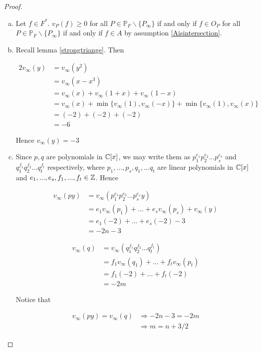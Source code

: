 \begin{proof}
\begin{enumerate}[(a)]
	\item \label{inAiff} Let $f\in F^*$. $v_P(f) \geq 0 $ 
	for all $P\in \mathbb{P}_F \backslash \lbrace P_\infty \rbrace $ 
	if and only if
	$f \in O_P$ for all
	$P\in \mathbb{P}_F \backslash \lbrace P_\infty \rbrace $ 
	if and only if $f \in A$ by assumption \ref{Aisintersection}.

	\item Recall lemma \ref{strongtriange}. Then 

	\begin{align*}
		2v_\infty(y) &= v_\infty(y^2) \\
		&= v_\infty(x - x^3) \\
		&= v_\infty(x) + v_\infty(1+x) + v_\infty (1-x) \\
		&= v_\infty(x) + \min \lbrace v_\infty(1), v_\infty(-x) \rbrace + \min \lbrace v_\infty(1) , v_\infty(x) \rbrace \\
		&= (-2) + (-2) + (-2) \\
		&= -6
	\end{align*}

	Hence $v_\infty(y) = -3 $

	\item Since $p,q$ are polynomials in $\mathbb{C} [x]$, we may 
	write them as $p_1^{e_1}p_2^{e_2}...p_s^{e_s}$ and
	$q_1^{f_1}q_2^{f_2}...q_t^{f_t}$ respectively, 
	where $p_1,...,p_s,q_1,...q_t$ are linear polynomials 
	in $\mathbb{C}[x]$ and $e_1,...,e_s,f_1,...,f_t \in \mathbb{Z}$. Hence 

	\begin{align*}
		v_\infty(py) &=v_\infty(p_1^{e_1}p_2^{e_2}...p_s^{e_s}y) \\
		&= e_1v_\infty(p_1) + ... + e_sv_\infty(p_s) + v_\infty (y)  \\
		&= e_1(-2) + ... + e_s(-2) - 3 \\
		&= -2n - 3
	\end{align*}

	\begin{align*}
		v_\infty(q) &=v_\infty(q_1^{f_1}q_2^{f_2}...q_t^{f_t}) \\
		&= f_1v_\infty(q_1) + ... + f_tv_\infty(p_t)  \\
		&= f_1(-2) + ... + f_t(-2) \\
		&= -2m
	\end{align*}

	Notice that 

	\begin{align*}
		v_\infty(py)=v_\infty(q) & \Longrightarrow -2n - 3 =  -2m  \\
		& \Longrightarrow m = n + 3/2
	\end{align*}


\end{enumerate}
\end{proof}
